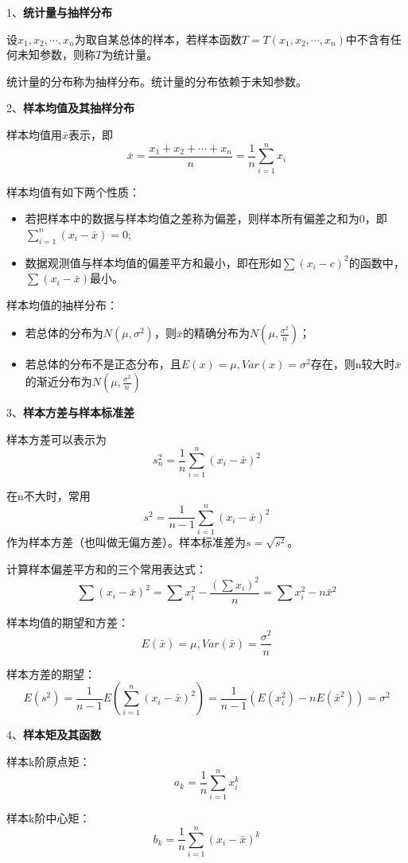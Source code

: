 \documentclass[
]{book}
\begin{document}
1、\textbf{统计量与抽样分布}

设\(x_1,x_2,\cdots,x_n\)为取自某总体的样本，若样本函数\(T=T(x_1,x_2,\cdots,x_n)\)中不含有任何未知参数，则称\(T\)为统计量。

统计量的分布称为抽样分布。统计量的分布依赖于未知参数。

2、\textbf{样本均值及其抽样分布}

样本均值用\(\bar{x}\)表示，即
\[
\bar{x}=\frac{x_1+x_2+\cdots+x_n}{n}=\frac{1}{n}\sum_{i=1}^nx_i
\]

样本均值有如下两个性质：

\begin{itemize}
\item
  若把样本中的数据与样本均值之差称为偏差，则样本所有偏差之和为0，即\(\sum_{i=1}^n(x_i-\bar{x})=0\);
\item
  数据观测值与样本均值的偏差平方和最小，即在形如\(\sum(x_i-c)^2\)的函数中，\(\sum(x_i-\bar{x})\)最小。
\end{itemize}

样本均值的抽样分布：

\begin{itemize}
\item
  若总体的分布为\(N(\mu,\sigma^2)\)，则\(\bar{x}\)的精确分布为\(N(\mu,\frac{\sigma^2}{n})\)；
\item
  若总体的分布不是正态分布，且\(E(x)=\mu,Var(x)=\sigma^2\)存在，则n较大时\(\bar{x}\)的渐近分布为\(N(\mu,\frac{\sigma^2}{n})\)
\end{itemize}

3、\textbf{样本方差与样本标准差}

样本方差可以表示为
\[
s_n^2=\frac{1}{n}\sum_{i=1}^n(x_i-\bar{x})^2
\]

在n不大时，常用
\[
s^2=\frac{1}{n-1}\sum_{i=1}^n(x_i-\bar{x})^2
\]
作为样本方差（也叫做无偏方差）。样本标准差为\(s=\sqrt{s^2}\)。

计算样本偏差平方和的三个常用表达式：
\[
\sum(x_i-\bar{x})^2=\sum x_i^2-\frac{(\sum x_i)^2}{n}=\sum x_i^2-n\bar{x}^2
\]

样本均值的期望和方差：
\[
E(\bar{x})=\mu,Var(\bar{x})=\frac{\sigma^2}{n}
\]

样本方差的期望：
\[
E(s^2)=\frac{1}{n-1}E(\sum_{i=1}^n(x_i-\bar{x})^2)=\frac{1}{n-1}(E(x_i^2)-nE(\bar{x}^2)) =\sigma^2
\]

4、\textbf{样本矩及其函数}

样本k阶原点矩：
\[
a_k=\frac{1}{n}\sum_{i=1}^nx_i^k
\]

样本k阶中心矩：
\[
b_k=\frac{1}{n}\sum_{i=1}^n(x_i-\bar{x})^k
\]
\end{document}
